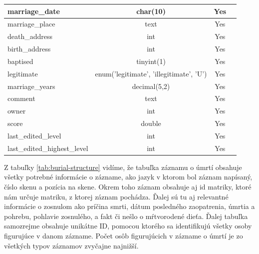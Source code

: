 \begin{longtable}{|l|c|c|c|}
marriage\_date & char(10) & Yes \\ \hline
marriage\_place & text & Yes \\ \hline
death\_address & int & Yes \\ \hline
birth\_address & int & Yes \\ \hline
baptised & tinyint(1) & Yes \\ \hline
legitimate & enum('legitimate', 'illegitimate', 'U') & Yes \\ \hline
marriage\_years & decimal(5,2) & Yes \\ \hline
comment & text & Yes \\ \hline
owner & int & Yes \\ \hline
score & double & Yes \\ \hline
last\_edited\_level & int & Yes \\ \hline
last\_edited\_highest\_level & int & Yes \\ \hline
 \end{longtable}

Z tabuľky \ref{tab:burial-structure} vidíme, že tabuľka záznamu o úmrtí obsahuje všetky potrebné informácie o zázname, ako jazyk v ktorom bol záznam napísaný, číslo skenu a pozícia na skene. Okrem toho záznam obsahuje aj id matriky, ktoré nám určuje matriku, z ktorej záznam pochádza. Ďalej sú tu aj relevantné informácie o zosnulom ako príčina smrti, dátum posledného zaopatrenia, úmrtia a pohrebu, pohlavie zosnulého, a fakt či nešlo o mŕtvorodené dieťa. Ďalej tabuľka samozrejme obsahuje unikátne ID, pomocou ktorého sa identifikujú všetky osoby figurujúce v danom zázname. Počet osôb figurujúcich v zázname o úmrtí je zo všetkých typov záznamov zvyčajne najnižší.


